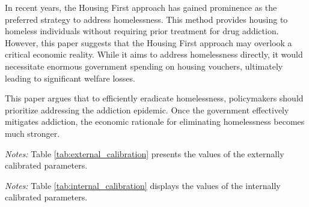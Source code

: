 \documentclass[parskip=full]{article}
\newenvironment{fignote2}[1]
{
\par
\medskip
\begin{minipage}{#1}
\footnotesize
}
{
\end{minipage}
}
\begin{document}
In recent years, the Housing First approach has gained prominence as the preferred strategy to address homelessness. This method provides housing to homeless individuals without requiring prior treatment for drug addiction. However, this paper suggests that the Housing First approach may overlook a critical economic reality. While it aims to address homelessness directly, it would necessitate enormous government spending on housing vouchers, ultimately leading to significant welfare losses. 

This paper argues that to efficiently eradicate homelessness, policymakers should prioritize addressing the addiction epidemic. Once the government effectively mitigates addiction, the economic rationale for eliminating homelessness becomes much stronger.




\vspace{1cm}

\begin{table}[H]
    \centering
    \caption{Externally assigned parameter values}
    \vspace{-1.25cm}
    \label{tab:external_calibration}
    
    \vspace{-0.65cm}
    \begin{fignote2}{1.11\textwidth}
    \hspace*{-0.7cm}
    \textit{Notes:} Table \ref{tab:external_calibration} presents the values of the externally calibrated parameters.
    \end{fignote2}
\end{table}

\vspace{1cm}

\begin{table}[H]
    \centering
    \caption{Internally assigned parameter values}
    \vspace{-1.25cm}
    \label{tab:internal_calibration}
    
    \vspace{-0.65cm}
    \begin{fignote2}{1.11\textwidth}
    \hspace*{-1.3cm}
    \textit{Notes:} Table \ref{tab:internal_calibration} displays the values of the internally calibrated parameters.
    \end{fignote2}
\end{table}

\vspace{1cm}
\end{document}
